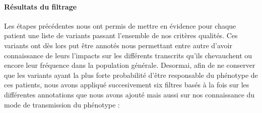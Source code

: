 \documentclass[12pt,twoside]{reedthesis}
\theoremstyle{definition}
\theoremstyle{definition}
\theoremstyle{remark}
\begin{document}
  \newpage
  
  \paragraph{Résultats du filtrage}\label{resultats-du-filtrage}
  
  Les étapes précédentes nous ont permis de mettre en évidence pour chaque
  patient une liste de variants passant l'ensemble de nos critères
  qualités. Ces variants ont dès lors put être annotés nous permettant
  entre autre d'avoir connaissance de leurs l'impacts sur les différents
  transcrits qu'ils chevauchent ou encore leur fréquence dans la
  population générale. Desormai, afin de ne conserver que les variants
  ayant la plus forte probabilité d'être responsable du phénotype de ces
  patients, nous avons appliqué succesivement six filtres basés à la fois
  sur les différentes annotations que nous avons ajouté mais aussi sur nos
  connaissance du mode de transmission du phénotype :
  
\end{document}
